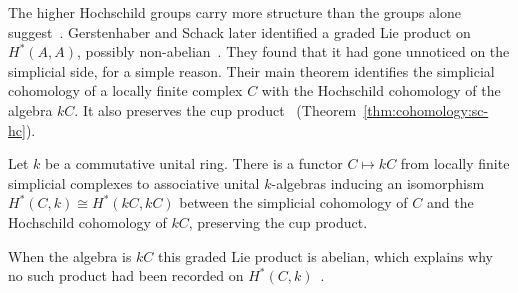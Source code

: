 The higher Hochschild groups carry more structure than the groups alone
suggest~\cite[p.~144]{GerstenhaberSchack1983}. Gerstenhaber and Schack later
identified a graded Lie product on $H^*(A,A)$,
possibly non-abelian~\cite[p.~144]{GerstenhaberSchack1983}. They found that it had
gone unnoticed on the simplicial side, for a simple reason. Their main theorem
identifies the simplicial cohomology of a locally finite complex $C$ with the
Hochschild cohomology of the algebra $kC$. It also preserves the cup
product~ (Theorem~\ref{thm:cohomology:sc-hc})\cite[pp.~143--144]{GerstenhaberSchack1983}.

\begin{theorem}[{SC $=$ HC, \cite[pp.~143--144]{GerstenhaberSchack1983}}]\label{thm:cohomology:sc-hc}
Let $k$ be a commutative unital ring. There is a functor $C \mapsto kC$ from
locally finite simplicial complexes to associative unital $k$-algebras inducing an
isomorphism $H^*(C,k) \cong H^*(kC,kC)$ between the simplicial cohomology of $C$
and the Hochschild cohomology of $kC$, preserving the cup product.
\end{theorem}

When the algebra is $kC$ this graded Lie product is abelian, which explains why no
such product had been recorded on $H^*(C,k)$~\cite[p.~144]{GerstenhaberSchack1983}.

